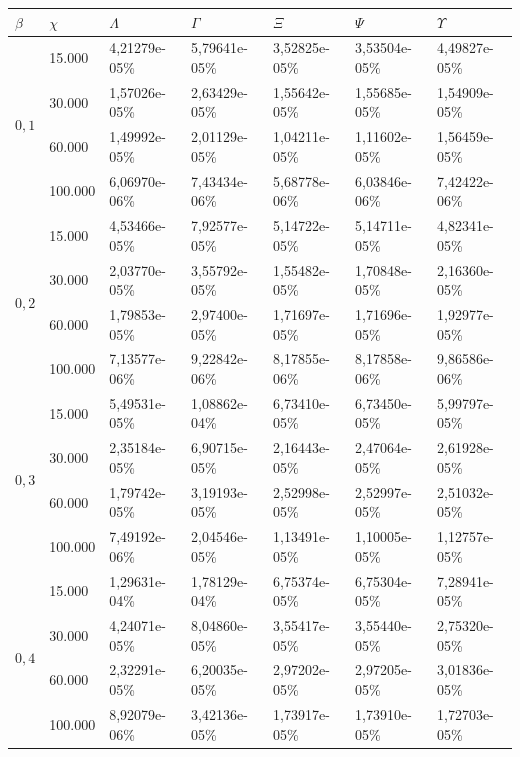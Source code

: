 \begin{table}[!ht]
\begin{center}
\begin{tabular}{|l|l|l|l|l|l|l|} %
\hline
$\beta$ & $\chi$ & $\Lambda$ & $\Gamma$ & $\Xi$ & $\Psi$ & $\Upsilon$ \\
\hline
\multirow{4}{*}{$0,1$}
& 15.000 & 4,21279e-05\% & 5,79641e-05\% & 3,52825e-05\% & 3,53504e-05\% & 4,49827e-05\% \\
& 30.000 & 1,57026e-05\% & 2,63429e-05\% & 1,55642e-05\% & 1,55685e-05\% & 1,54909e-05\% \\
& 60.000 & 1,49992e-05\% & 2,01129e-05\% & 1,04211e-05\% & 1,11602e-05\% & 1,56459e-05\% \\
& 100.000 & 6,06970e-06\% & 7,43434e-06\% & 5,68778e-06\% & 6,03846e-06\% & 7,42422e-06\% \\
\hline
\multirow{4}{*}{$0,2$}
& 15.000 & 4,53466e-05\% & 7,92577e-05\% & 5,14722e-05\% & 5,14711e-05\% & 4,82341e-05\% \\
& 30.000 & 2,03770e-05\% & 3,55792e-05\% & 1,55482e-05\% & 1,70848e-05\% & 2,16360e-05\% \\
& 60.000 & 1,79853e-05\% & 2,97400e-05\% & 1,71697e-05\% & 1,71696e-05\% & 1,92977e-05\% \\
& 100.000 & 7,13577e-06\% & 9,22842e-06\% & 8,17855e-06\% & 8,17858e-06\% & 9,86586e-06\% \\
\hline %
\multirow{4}{*}{$0,3$}
& 15.000 & 5,49531e-05\% & 1,08862e-04\% & 6,73410e-05\% & 6,73450e-05\% & 5,99797e-05\% \\
& 30.000 & 2,35184e-05\% & 6,90715e-05\% & 2,16443e-05\% & 2,47064e-05\% & 2,61928e-05\% \\
& 60.000 & 1,79742e-05\% & 3,19193e-05\% & 2,52998e-05\% & 2,52997e-05\% & 2,51032e-05\% \\
& 100.000 & 7,49192e-06\% & 2,04546e-05\% & 1,13491e-05\% & 1,10005e-05\% & 1,12757e-05\% \\
\hline %
\multirow{4}{*}{$0,4$}
& 15.000 & 1,29631e-04\% & 1,78129e-04\% & 6,75374e-05\% & 6,75304e-05\% & 7,28941e-05\% \\
& 30.000 & 4,24071e-05\% & 8,04860e-05\% & 3,55417e-05\% & 3,55440e-05\% & 2,75320e-05\% \\
& 60.000 & 2,32291e-05\% & 6,20035e-05\% & 2,97202e-05\% & 2,97205e-05\% & 3,01836e-05\% \\
& 100.000 & 8,92079e-06\% & 3,42136e-05\% & 1,73917e-05\% & 1,73910e-05\% & 1,72703e-05\% \\

\end{tabular}
\end{center}
\end{table}
